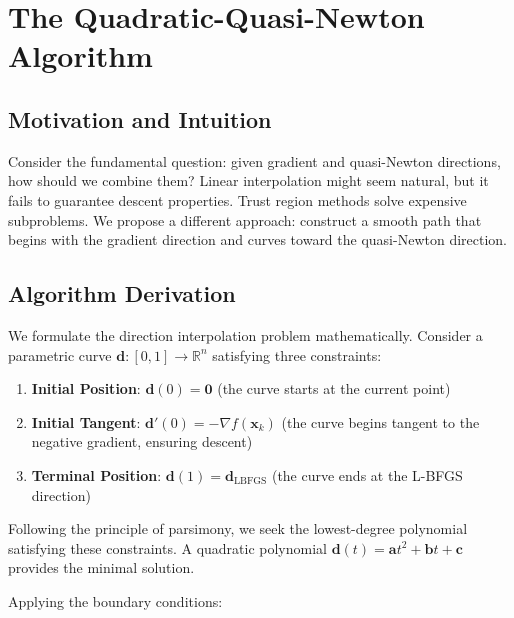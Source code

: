 \hypertarget{the-quadratic-quasi-newton-algorithm}{%
\section{The Quadratic-Quasi-Newton Algorithm}\label{the-quadratic-quasi-newton-algorithm}}

\hypertarget{motivation-and-intuition}{%
\subsection{Motivation and Intuition}\label{motivation-and-intuition}}

Consider the fundamental question: given gradient and quasi-Newton directions, how should we combine them?
Linear interpolation might seem natural, but it fails to guarantee descent properties.
Trust region methods solve expensive subproblems.
We propose a different approach: construct a smooth path that begins with the gradient direction and curves toward the quasi-Newton direction.

\hypertarget{algorithm-derivation}{%
\subsection{Algorithm Derivation}\label{algorithm-derivation}}

We formulate the direction interpolation problem mathematically. Consider a parametric curve
\(\mathbf{d}: [0,1] \rightarrow \mathbb{R}^n\) satisfying three constraints:

\begin{enumerate}
\def\labelenumi{\arabic{enumi}.}
\item
  \textbf{Initial Position}: \(\mathbf{d}(0) = \mathbf{0}\) (the curve starts at the current point)
\item
  \textbf{Initial Tangent}: \(\mathbf{d}'(0) = -\nabla f(\mathbf{x}_k)\) (the curve begins tangent to the negative gradient, ensuring descent)
\item
  \textbf{Terminal Position}: \(\mathbf{d}(1) = \mathbf{d}_{\text{LBFGS}}\) (the curve ends at the L-BFGS direction)
\end{enumerate}

Following the principle of parsimony, we seek the lowest-degree polynomial satisfying these constraints.
A quadratic polynomial \(\mathbf{d}(t) = \mathbf{a}t^2 + \mathbf{b}t + \mathbf{c}\) provides the minimal solution.

Applying the boundary conditions:

